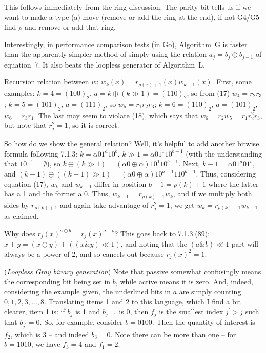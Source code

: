 \vskip 0.08in \hfil\break
This follows immediately from the ring discussion.  
The parity bit tells us if we want to make a type (a) move (remove or add the ring
at the end), if not G4/G5 find $\rho$ and remove or add that ring.

Interestingly, in performance comparison tests (in Go), Algorithm~G is faster
than the apparently simpler method of simply using the relation
$a_j = b_j \oplus b_{j-1}$ of equation~7.  It also beats the loopless
generator of Algorithm~L.

\vskip 0.08in \noindent [p 288] Recursion relation between $w$:
$w_k\left(x\right) = r_{\rho\left(x\right) + 1}\left(x\right) w_{k-1} \left(x\right)$.
First, some examples: $k = 4 = \left(1 0 0 \right)_2$, $a = k \oplus 
\left(k \gg 1\right) = \left(1 1 0 \right)_2$, so from (17)
$w_4 = r_2 r_3$; $k = 5 = \left(1 0 1\right)_2$, $a = \left( 1 1 1 \right)_2$,
so $w_5 = r_1 r_2 r_3$; $k = 6 = \left( 1 1 0 \right)_2$,
$a = \left(1 0 1\right)_2$, $w_6 = r_3 r_1$.  The last may seem to
violate (18), which says that $w_6 = r_2 w_5 = r_1 r_2^2 r_3$, but
note that $r_j^2 = 1$, so it is correct.

So how do we show the general relation?  Well, it's helpful to add another
bitwise formula following 7.1.3: $k = \alpha 0 1^a 1 0^b$,
$k \gg 1 = \alpha 0 1^1 1 0^{b-1}$ (with the understanding that
$1 0^{-1} = \emptyset$), so $k \oplus \left(k \gg 1\right) = 
\left(\alpha 0 \oplus \alpha\right) 1 0^1 1 0^{b-1}$.
Next, $k - 1 = \alpha 0 1^a 0 1^b$, and $\left(k - 1\right) \oplus
\left(\left(k - 1\right) \gg 1\right) = \left(\alpha 0 \oplus \alpha\right)
1 0^{a-1} 1 1 0^{b-1}$.  Thus, considering equation (17),
$w_k$ and $w_{k-1}$ differ in position $b + 1 = \rho(k) + 1$
where the latter has a 1 and the former a 0.  Thus,
$w_{k-1} = r_{\rho\left(k\right) + 1} w_k$, and if we multiply
both sides by $r_{\rho \left( k \right)+1}$ and again take advantage
of $r_j^2 = 1$, we get $w_k = r_{\rho\left(k\right) + 1} w_{k-1}$
as claimed.

\vskip 0.08in \noindent [p 288] Why does $r_j\left(x\right)^{a \oplus b} =
r_j\left(x\right)^{a+b}$?  This goes back to 7.1.3.(89):  
$x + y = \left(x \oplus y\right) + \left(\left(x \& y \right) \ll 1\right)$,
and noting that the $\left(a \& b\right) \ll 1$ part will always be a power
of 2, and so cancels out because $r_j\left(x\right)^2 = 1$.

\vskip 0.08in  ({\it Loopless Gray
binary generation})\hfil\break
Note that passive somewhat confusingly means the corresponding
bit being set in $b$, while active means it is zero.  And, indeed,
considering the example given, the underlined bits in $a$ are
simply counting $0, 1, 2, 3, \ldots , 8$.  Translating items 1 and 2
to this language, which I find a bit clearer, item 1 is:
if $b_j$ is 1 and $b_{j-1}$ is 0, then $f_j$ is the smallest index
$j^{\prime} > j$ such that $b_{j^{\prime}} = 0$.  So, for example,
consider $b = 0100$.  Then the quantity of interest is $f_2$,
which is 3 -- and indeed $b_3 = 0$.  Note there can be more
than one -- for $b=1010$, we have $f_3 = 4$ and $f_1 = 2$.

